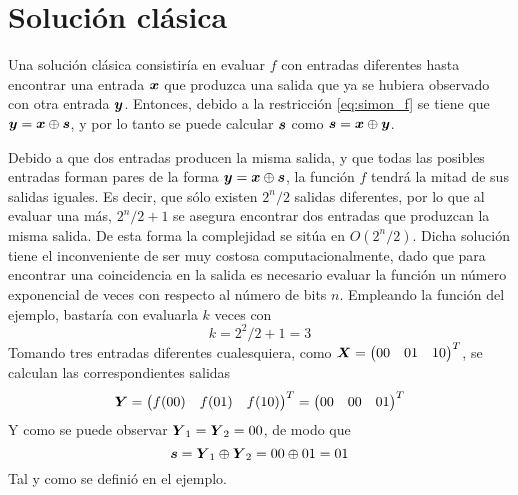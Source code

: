 \section{Solución clásica}

Una solución clásica consistiría en evaluar $f$ con entradas diferentes hasta 
encontrar una entrada $\boldsymbol{x}$ que produzca una salida que ya se hubiera observado 
con otra entrada $\boldsymbol{y}$. Entonces, debido a la restricción \ref{eq:simon_f} se 
tiene que $\boldsymbol{y} = \boldsymbol{x} \oplus \boldsymbol{s}$, y por lo tanto se puede calcular $\boldsymbol{s}$ como $\boldsymbol{s} = 
\boldsymbol{x} \oplus \boldsymbol{y}$.

Debido a que dos entradas producen la misma salida, y que todas las posibles 
entradas forman pares de la forma $\boldsymbol{y} = \boldsymbol{x} \oplus \boldsymbol{s}$, la función $f$ 
tendrá la mitad de sus salidas iguales. Es decir, que sólo existen $2^{n}/2$ 
salidas diferentes, por lo que al evaluar una más, $2^{n}/2 + 1$ se asegura 
encontrar dos entradas que produzcan la misma salida. De esta forma la 
complejidad se sitúa en $O(2^{n}/2)$. Dicha solución tiene el inconveniente de 
ser muy costosa computacionalmente, dado que para encontrar una coincidencia en 
la salida es necesario evaluar la función un número exponencial de veces con 
respecto al número de bits $n$.
%
Empleando la función del ejemplo, bastaría con evaluarla $k$ veces con
$$k = 2^2/2+1 = 3$$
Tomando tres entradas diferentes cualesquiera, como $\boldsymbol{X} = \begin{pmatrix} 00 & 01 & 
10 \end{pmatrix}^T$, se calculan las correspondientes salidas
$$ \boldsymbol{Y} = \begin{pmatrix} f(00) & f(01) & f(10) \end{pmatrix}^T = \begin{pmatrix} 00 &00 & 01 \end{pmatrix}^T $$
Y como se puede observar $\boldsymbol{Y}_1 = \boldsymbol{Y}_2 = 00$, de modo que
$$\boldsymbol{s} = \boldsymbol{Y}_1 \oplus \boldsymbol{Y}_2 = 00 \oplus 01 = 01$$
Tal y como se definió en el ejemplo.

